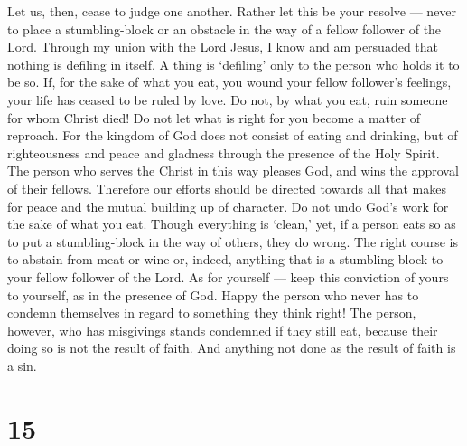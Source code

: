  Let us, then, cease to judge one another. Rather let this
be your resolve --- never to place a stumbling-block or an obstacle in
the way of a fellow follower of the Lord.  Through my union
with the Lord Jesus, I know and am persuaded that nothing is defiling in
itself. A thing is `defiling' only to the person who holds it to be so.
 If, for the sake of what you eat, you wound your fellow
follower's feelings, your life has ceased to be ruled by love. Do not,
by what you eat, ruin someone for whom Christ died!  Do not
let what is right for you become a matter of reproach.  For
the kingdom of God does not consist of eating and drinking, but of
righteousness and peace and gladness through the presence of the Holy
Spirit.  The person who serves the Christ in this way
pleases God, and wins the approval of their fellows. 
Therefore our efforts should be directed towards all that makes for
peace and the mutual building up of character.  Do not undo
God's work for the sake of what you eat. Though everything is `clean,'
yet, if a person eats so as to put a stumbling-block in the way of
others, they do wrong.  The right course is to abstain from
meat or wine or, indeed, anything that is a stumbling-block to your
fellow follower of the Lord.  As for yourself --- keep this
conviction of yours to yourself, as in the presence of God. Happy the
person who never has to condemn themselves in regard to something they
think right!  The person, however, who has misgivings
stands condemned if they still eat, because their doing so is not the
result of faith. And anything not done as the result of faith is a sin.

\hypertarget{section-14}{%
\section{15}\label{section-14}}

